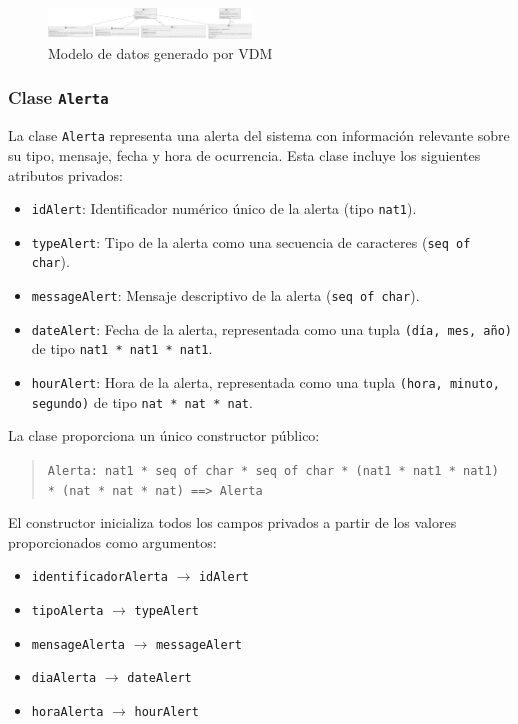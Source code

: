\documentclass[journal]{IEEEtran}
\begin{document}
\begin{figure}[H]
    \centering
    \includegraphics[width=0.48\textwidth]{img/diagrama-clases.jpg}
    \caption{Modelo de datos generado por VDM}
    \label{fig:VDM_model}
\end{figure}


    \subsubsection*{Clase \texttt{Alerta}}

    La clase \texttt{Alerta} representa una alerta del sistema con información relevante sobre su tipo, mensaje, fecha y hora de ocurrencia. Esta clase incluye los siguientes atributos privados:

    \begin{itemize}
    \item \texttt{idAlert}: Identificador numérico único de la alerta (tipo \texttt{nat1}).
    \item \texttt{typeAlert}: Tipo de la alerta como una secuencia de caracteres (\texttt{seq of char}).
    \item \texttt{messageAlert}: Mensaje descriptivo de la alerta (\texttt{seq of char}).
    \item \texttt{dateAlert}: Fecha de la alerta, representada como una tupla \texttt{(día, mes, año)} de tipo \texttt{nat1 * nat1 * nat1}.
    \item \texttt{hourAlert}: Hora de la alerta, representada como una tupla \texttt{(hora, minuto, segundo)} de tipo \texttt{nat * nat * nat}.
    \end{itemize}

    La clase proporciona un único constructor público:

    \begin{quote}
    \texttt{Alerta: nat1 * seq of char * seq of char * (nat1 * nat1 * nat1) * (nat * nat * nat) \texttt{==>} Alerta}
    \end{quote}

    El constructor inicializa todos los campos privados a partir de los valores proporcionados como argumentos:
    \begin{itemize}
    \item \texttt{identificadorAlerta} $\rightarrow$ \texttt{idAlert}
    \item \texttt{tipoAlerta} $\rightarrow$ \texttt{typeAlert}
    \item \texttt{mensageAlerta} $\rightarrow$ \texttt{messageAlert}
    \item \texttt{diaAlerta} $\rightarrow$ \texttt{dateAlert}
    \item \texttt{horaAlerta} $\rightarrow$ \texttt{hourAlert}
    \end{itemize}
\end{document}
